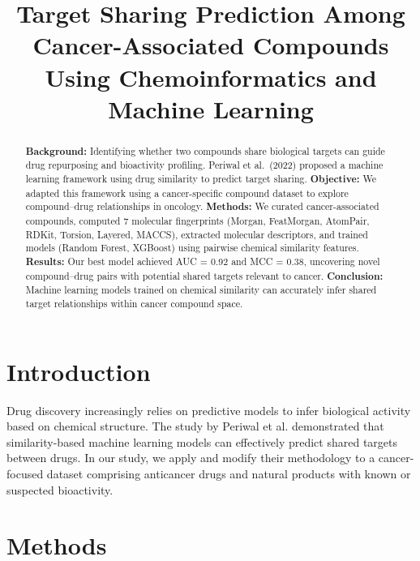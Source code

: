 \documentclass[11pt,a4paper]{article}
\title{\textbf{Target Sharing Prediction Among Cancer-Associated Compounds Using Chemoinformatics and Machine Learning}}
\date{}
\begin{document}
\maketitle

\begin{abstract}
\textbf{Background:} Identifying whether two compounds share biological targets can guide drug repurposing and bioactivity profiling. Periwal et al.\ (2022) proposed a machine learning framework using drug similarity to predict target sharing.  
\textbf{Objective:} We adapted this framework using a cancer-specific compound dataset to explore compound–drug relationships in oncology.  
\textbf{Methods:} We curated cancer-associated compounds, computed 7 molecular fingerprints (Morgan, FeatMorgan, AtomPair, RDKit, Torsion, Layered, MACCS), extracted molecular descriptors, and trained models (Random Forest, XGBoost) using pairwise chemical similarity features.  
\textbf{Results:} Our best model achieved AUC = 0.92 and MCC = 0.38, uncovering novel compound–drug pairs with potential shared targets relevant to cancer.  
\textbf{Conclusion:} Machine learning models trained on chemical similarity can accurately infer shared target relationships within cancer compound space.
\end{abstract}

\section{Introduction}
Drug discovery increasingly relies on predictive models to infer biological activity based on chemical structure. The study by Periwal et al. demonstrated that similarity-based machine learning models can effectively predict shared targets between drugs. In our study, we apply and modify their methodology to a cancer-focused dataset comprising anticancer drugs and natural products with known or suspected bioactivity.

\section{Methods}
\end{document}
